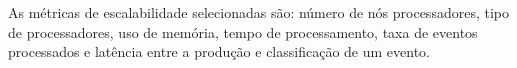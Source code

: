 




As métricas de escalabilidade selecionadas são: número de nós processadores,
tipo de processadores, uso de memória, tempo de processamento, taxa de eventos
processados e latência entre a produção e classificação de um evento.


